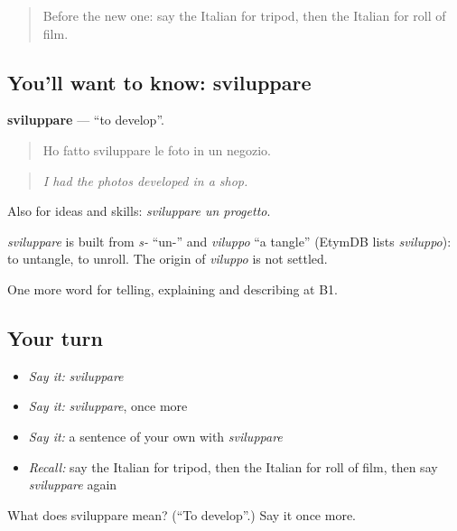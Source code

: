 \label{lesson:IT-C506-sviluppare}



\begin{quote}
Before the new one: say the Italian for tripod, then the Italian for roll of film.
\end{quote}

\subsection*{You'll want to know: sviluppare}
\textbf{sviluppare} — \textquotedblleft{}to develop\textquotedblright{}.

\begin{quote}
Ho fatto sviluppare le foto in un negozio.
\end{quote}

\begin{quote}
\emph{I had the photos developed in a shop.}
\end{quote}

Also for ideas and skills: \emph{sviluppare un progetto}.

\begin{cousinweb}
\emph{sviluppare} is built from \emph{s-} \textquotedblleft{}un-\textquotedblright{} and \emph{viluppo} \textquotedblleft{}a tangle\textquotedblright{} (EtymDB lists \emph{sviluppo}): to untangle, to unroll. The origin of \emph{viluppo} is not settled.
\end{cousinweb}

\begin{grammarlens}[title={What you've built}]
One more word for telling, explaining and describing at B1.
\end{grammarlens}

\subsection*{Your turn}
\begin{itemize}
\raggedright
  \item \emph{Say it:} \emph{sviluppare}
  \item \emph{Say it:} \emph{sviluppare}, once more
  \item \emph{Say it:} a sentence of your own with \emph{sviluppare}
  \item \emph{Recall:} say the Italian for tripod, then the Italian for roll of film, then say \emph{sviluppare} again
\end{itemize}

\begin{tcolorbox}[breakable,colback=teal!4,colframe=teal!35!black,title={Before you move on}]
What does sviluppare mean? (\textquotedblleft{}To develop\textquotedblright{}.) Say it once more.
\end{tcolorbox}
